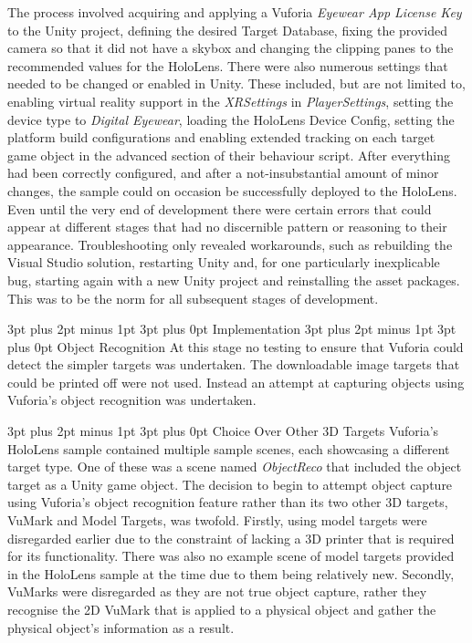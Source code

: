 \documentclass[12pt,a4paper,oneside]{article}
\makeatletter
\renewcommand\paragraph{\@startsection {paragraph}{1}{0mm} %
	                           {3pt plus 2pt minus 1pt} %
	                           {3pt plus 0pt} %
	                           {\normalfont}}
\renewcommand\subsubsection{\@startsection {subsubsection}{1}{0mm} %
	                           {3pt plus 2pt minus 1pt} %
	                           {3pt plus 0pt} %
	                           {\normalfont\bfseries}}
\renewcommand\subsection{\@startsection {subsection}{1}{0mm} %
                               {3pt plus 2pt minus 1pt} %
                               {3pt plus 0pt} %
                               {\large\bfseries}}
\makeatother
\begin{document}
The process involved acquiring and applying a Vuforia \textit{Eyewear App License Key} to the Unity project, defining the desired Target Database, fixing the provided camera so that it did not have a skybox and changing the clipping panes to the recommended values for the HoloLens. There were also numerous settings that needed to be changed or enabled in Unity. These included, but are not limited to, enabling virtual reality support in the \textit{XRSettings} in \textit{PlayerSettings}, setting the device type to \textit{Digital Eyewear}, loading the HoloLens Device Config, setting the platform build configurations and enabling extended tracking on each target game object in the advanced section of their behaviour script.  After everything had been correctly configured, and after a not-insubstantial amount of minor changes, the sample could on occasion be successfully deployed to the HoloLens. Even until the very end of development there were certain errors that could appear at different stages that had no discernible pattern or reasoning to their appearance. Troubleshooting only revealed workarounds, such as rebuilding the Visual Studio solution, restarting Unity and, for one particularly inexplicable bug, starting again with a new Unity project and reinstalling the asset packages. This was to be the norm for all subsequent stages of development.

\subsection{Implementation}
\subsubsection{Object Recognition}
At this stage no testing to ensure that Vuforia could detect the simpler targets was undertaken. The downloadable image targets that could be printed off were not used. Instead an attempt at capturing objects using Vuforia's object recognition was undertaken.

\paragraph{Choice Over Other 3D Targets}
Vuforia's HoloLens sample contained multiple sample scenes, each showcasing a different target type. One of these was a scene named \textit{ObjectReco} that included the object target as a Unity game object. The decision to begin to attempt object capture using Vuforia's object recognition feature rather than its two other 3D targets, VuMark and Model Targets, was twofold. Firstly, using model targets were disregarded earlier due to the constraint of lacking a 3D printer that is required for its functionality. There was also no example scene of model targets provided in the HoloLens sample at the time due to them being relatively new. Secondly, VuMarks were disregarded as they are not true object capture, rather they recognise the 2D VuMark that is applied to a physical object and gather the physical object's information as a result.
\end{document}
